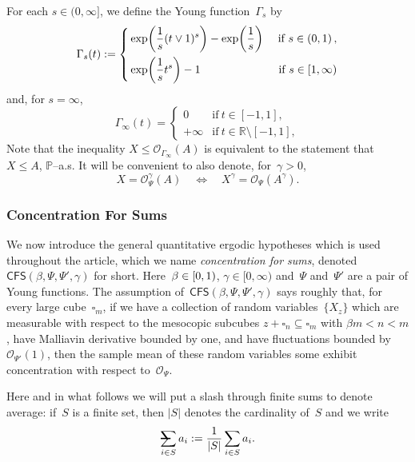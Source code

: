 \documentclass[11pt]{article} %
\makeatletter
\let\oldsquare\square %
\renewcommand{\square}{\oldsquare}
\numberwithin{equation}{section}
\theoremstyle{definition}
\let\originalleft\left
\let\originalright\right
\renewcommand{\left}{\mathopen{}\mathclose\bgroup\originalleft}
\renewcommand{\right}{\aftergroup\egroup\originalright}
\newcommand*{\R}{\ensuremath{\mathbb{R}}}
\newcommand{\cu}{\square}
\renewcommand{\P}{\mathbb{P}}
\renewcommand{\O}{\mathcal{O}}
\newcommand{\avsum}{\mathop{\mathpalette\avsuminner\relax}\displaylimits}
\newcommand\avsuminner[2]{%
  {\sbox0{$\m@th#1\sum$}%
   \vphantom{\usebox0}%
   \ooalign{%
     \hidewidth
     \smash{\,\rule[.23em]{8.8pt}{1.1pt} \relax}%
     \hidewidth\cr
     $\m@th#1\sum$\cr
   }%
  }%
}
\newcommand{\CFS}{\mathsf{CFS}}
\makeatother
\begin{document}
\smallskip

For each $s\in (0,\infty]$, we define the Young function~$\Gamma_s$ by 
\begin{equation}
\label{e.Gamma.s.geq1}
\Gamma_s(t) := 
\left\{
\begin{aligned}
& \exp\biggl( \frac1s ( t\vee 1 )^s \biggr) - \exp\biggl( \frac1s \biggr) & \ \mbox{if} \ s \in (0,1)\,, \\
& \exp\biggl( \frac1s t^s \biggr) - 1 & \ \mbox{if} \ s \in [1,\infty)
\end{aligned}
\right.
\end{equation}
and, for $s=\infty$, 
\begin{equation}
\label{e.Gamma.infty}
\Gamma_\infty(t) = 
\begin{cases}
0 & \mbox{if}  \  t \in [-1,1], \\
+\infty & \mbox{if} \ t \in \R\setminus [-1,1], 
\end{cases}
\end{equation}
Note that the inequality $X \leq \O_{\Gamma_\infty}(A)$ is equivalent to the statement that $X \leq A$, $\P$--a.s. 
It will be convenient to also denote, for~$\gamma>0$, 
\begin{equation*}
X = \O_\Psi^\gamma(A) 
\quad \iff \quad
X^\gamma = \O_\Psi (A^\gamma). 
\end{equation*}


\subsubsection{Concentration For Sums}
We now introduce the general quantitative ergodic hypotheses which is used throughout the article, which we name \emph{concentration for sums}, denoted~$\CFS(\beta,\Psi,\Psi',\gamma)$ for short. 
Here~$\beta \in \left[0,1\right)$, $\gamma\in [0,\infty)$ and~$\Psi$ and~$\Psi'$ are a pair of Young functions.
The assumption of~$\CFS(\beta,\Psi,\Psi',\gamma)$ says roughly that, for every large cube~$\cu_m$, if we have a collection of random variables~$\{ X_z\}$ which are measurable with respect to the mesocopic subcubes $z+\cu_n \subseteq \cu_m$ with $\beta m < n < m$, have Malliavin derivative bounded by one, and have fluctuations bounded by~$\O_{\Psi'}(1)$, then the sample mean of these random variables some exhibit concentration with respect to~$\O_\Psi$.

\smallskip

Here and in what follows we will put a slash through finite sums to denote average: if~$S$ is a finite set, then $|S|$ denotes the cardinality of~$S$ and we write
\begin{equation*}
\avsum_{i \in S} a_i := \frac{1}{|S|} \sum_{i\in S} a_i.
\end{equation*}
\end{document}
